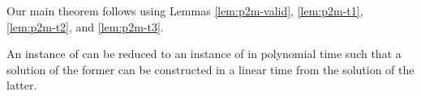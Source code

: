 Our main theorem follows using Lemmas \ref{lem:p2m-valid}, \ref{lem:p2m-t1}, \ref{lem:p2m-t2}, and \ref{lem:p2m-t3}.

\begin{theorem}\label{thm:p2m}
An instance of \EOPL can be reduced to an instance of \EOML in polynomial time such that a solution of the former can be constructed in a linear time from the solution of the latter. 
\end{theorem}